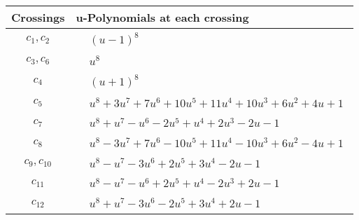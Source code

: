\documentclass[1p]{elsarticle_modified}
\theoremstyle{definition}
\begin{document}
\begin{tabular}{m{50pt}|m{274pt}}
Crossings & \hspace{64pt}u-Polynomials at each crossing \\
\hline $$\begin{aligned}c_{1},c_{2}\end{aligned}$$&$\begin{aligned}
&(u-1)^8
\end{aligned}$\\
\hline $$\begin{aligned}c_{3},c_{6}\end{aligned}$$&$\begin{aligned}
&u^8
\end{aligned}$\\
\hline $$\begin{aligned}c_{4}\end{aligned}$$&$\begin{aligned}
&(u+1)^8
\end{aligned}$\\
\hline $$\begin{aligned}c_{5}\end{aligned}$$&$\begin{aligned}
&u^8+3 u^7+7 u^6+10 u^5+11 u^4+10 u^3+6 u^2+4 u+1
\end{aligned}$\\
\hline $$\begin{aligned}c_{7}\end{aligned}$$&$\begin{aligned}
&u^8+u^7- u^6-2 u^5+u^4+2 u^3-2 u-1
\end{aligned}$\\
\hline $$\begin{aligned}c_{8}\end{aligned}$$&$\begin{aligned}
&u^8-3 u^7+7 u^6-10 u^5+11 u^4-10 u^3+6 u^2-4 u+1
\end{aligned}$\\
\hline $$\begin{aligned}c_{9},c_{10}\end{aligned}$$&$\begin{aligned}
&u^8- u^7-3 u^6+2 u^5+3 u^4-2 u-1
\end{aligned}$\\
\hline $$\begin{aligned}c_{11}\end{aligned}$$&$\begin{aligned}
&u^8- u^7- u^6+2 u^5+u^4-2 u^3+2 u-1
\end{aligned}$\\
\hline $$\begin{aligned}c_{12}\end{aligned}$$&$\begin{aligned}
&u^8+u^7-3 u^6-2 u^5+3 u^4+2 u-1
\end{aligned}$\\
\hline
\end{tabular}\\~\\
\end{document}
